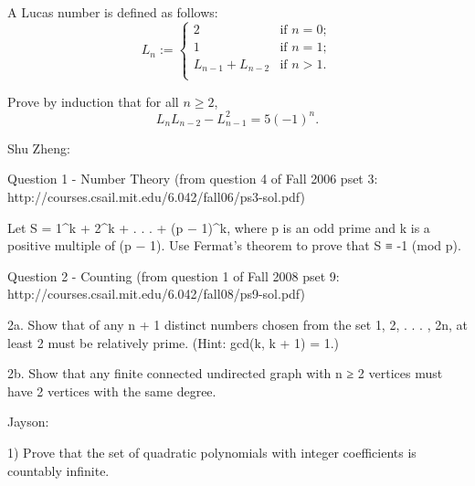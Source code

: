 \begin{problem}[Induction]

A Lucas number is defined as follows:
\begin{equation}
  L_n :=
  \begin{cases}
    2               & \text{if } n = 0; \\
    1               & \text{if } n = 1; \\
    L_{n-1}+L_{n-2} & \text{if } n > 1. \\
   \end{cases}
\end{equation}

Prove by induction that for all $n \geq 2$,
\[
L_n L_{n-2} - L_{n-1}^2 = 5 (-1)^n.
\]
\end{problem}


Shu Zheng:

Question 1 - Number Theory (from question 4 of Fall 2006 pset 3:
http://courses.csail.mit.edu/6.042/fall06/ps3-sol.pdf)

Let S = 1^k + 2^k + . . . + (p − 1)^k, where p is an odd prime and k
is a positive multiple of (p − 1). Use Fermat’s theorem to prove that
S ≡ -1 (mod p).

Question 2 - Counting (from question 1 of Fall 2008 pset 9:
http://courses.csail.mit.edu/6.042/fall08/ps9-sol.pdf)

2a. Show that of any n + 1 distinct numbers chosen from the set {1, 2,
  . . . , 2n}, at least 2 must be relatively prime. (Hint: gcd(k, k +
1) = 1.)

2b. Show that any finite connected undirected graph with n ≥ 2
vertices must have 2 vertices with the same degree.


Jayson:

1) Prove that the set of quadratic polynomials with integer coefficients is countably infinite.

